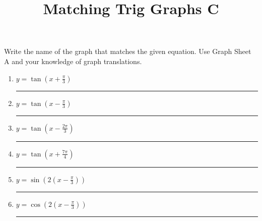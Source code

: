 \documentclass{article}
\begin{document}
\title{Matching Trig Graphs C}
\maketitle
\noindent
Write the name of the graph that matches the given equation. Use Graph Sheet
A and your knowledge of graph translations.
\begin{multicols}{2}
\begin{enumerate}
	\item $y=\tan(x+\frac{\pi}{3})$ \hspace{1cm} \rule{5cm}{0.5pt}
	\item $y=\tan(x-\frac{\pi}{3})$ \hspace{1cm} \rule{5cm}{0.5pt}
	\item $y=\tan(x-\frac{2\pi}{3})$ \hspace{1cm} \rule{5cm}{0.5pt}
	\item $y=\tan(x+\frac{7\pi}{4})$ \hspace{1cm} \rule{5cm}{0.5pt}
	\item $y=\sin (2(x-\frac{\pi}{3})) $ \hspace{1cm} \rule{5cm}{0.5pt}
	\item $y=\cos (2(x-\frac{\pi}{3}))$ \hspace{1cm} \rule{5cm}{0.5pt}
\end{enumerate}


\end{multicols}
\end{document}
